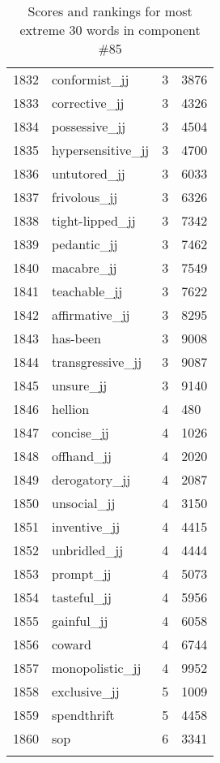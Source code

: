 \begin{longtable}[!htbp]{| rlr@{.}l |}
    1832 & conformist\_jj & 3 & 3876 \\
    1833 & corrective\_jj & 3 & 4326 \\
    1834 & possessive\_jj & 3 & 4504 \\
    1835 & hypersensitive\_jj & 3 & 4700 \\
    1836 & untutored\_jj & 3 & 6033 \\
    1837 & frivolous\_jj & 3 & 6326 \\
    1838 & tight-lipped\_jj & 3 & 7342 \\
    1839 & pedantic\_jj & 3 & 7462 \\
    1840 & macabre\_jj & 3 & 7549 \\
    1841 & teachable\_jj & 3 & 7622 \\
    1842 & affirmative\_jj & 3 & 8295 \\
    1843 & has-been & 3 & 9008 \\
    1844 & transgressive\_jj & 3 & 9087 \\
    1845 & unsure\_jj & 3 & 9140 \\
    1846 & hellion & 4 & 480 \\
    1847 & concise\_jj & 4 & 1026 \\
    1848 & offhand\_jj & 4 & 2020 \\
    1849 & derogatory\_jj & 4 & 2087 \\
    1850 & unsocial\_jj & 4 & 3150 \\
    1851 & inventive\_jj & 4 & 4415 \\
    1852 & unbridled\_jj & 4 & 4444 \\
    1853 & prompt\_jj & 4 & 5073 \\
    1854 & tasteful\_jj & 4 & 5956 \\
    1855 & gainful\_jj & 4 & 6058 \\
    1856 & coward & 4 & 6744 \\
    1857 & monopolistic\_jj & 4 & 9952 \\
    1858 & exclusive\_jj & 5 & 1009 \\
    1859 & spendthrift & 5 & 4458 \\
    1860 & sop & 6 & 3341 \\
    \hline
    \caption{Scores and rankings for most extreme 30 words in component \#85} \\
\end{longtable}
